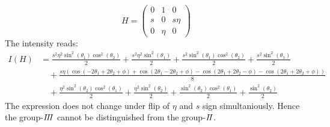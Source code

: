 \documentclass[prd,preprintnumbers,floatfix,
nofootinbib,superscriptaddress]{revtex4}
\begin{document}
\begin{equation}
  H = \begin{pmatrix}
    0 &1 &0 \\
    s & 0 &s\eta \\
    0 &\eta &0
  \end{pmatrix}
\end{equation}
The intensity reads:
\begin{align}
  I(H) &= \frac{s^{2} \eta^{2} \sin^{2}{\left (\theta_{1} \right )} \cos^{2}{\left (\theta_{2} \right )}}{2} + \frac{s^{2} \eta^{2} \sin^{2}{\left (\theta_{1} \right )}}{2} + \frac{s^{2} \sin^{2}{\left (\theta_{1} \right )} \cos^{2}{\left (\theta_{2} \right )}}{2} + \frac{s^{2} \sin^{2}{\left (\theta_{1} \right )}}{2} \\ \nonumber
   &\quad + \frac{s \eta \left(\cos{\left (- 2 \theta_{1} + 2 \theta_{2} + \phi \right )} + \cos{\left (2 \theta_{1} - 2 \theta_{2} + \phi \right )} - \cos{\left (2 \theta_{1} + 2 \theta_{2} - \phi \right )} - \cos{\left (2 \theta_{1} + 2 \theta_{2} + \phi \right )}\right)}{8}\\ \nonumber
   &\quad+\frac{\eta^{2} \sin^{2}{\left (\theta_{2} \right )} \cos^{2}{\left (\theta_{1} \right )}}{2} + \frac{\eta^{2} \sin^{2}{\left (\theta_{2} \right )}}{2} + \frac{\sin^{2}{\left (\theta_{2} \right )} \cos^{2}{\left (\theta_{1} \right )}}{2} + \frac{\sin^{2}{\left (\theta_{2} \right )}}{2}
\end{align}
The expression does not change under flip of $\eta$ and $s$ sign simultaniously.
Hence the group-${I\!I\!I}$ cannot be distinguished from the group-${I\!I}$.

\end{document}
